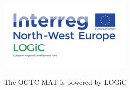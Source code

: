\documentclass{article}
\begin{document}
\begin{multicols*}{2}
\begin{itemize}
\end{itemize}

\vfill

\begin{center}

\includegraphics[width=\linewidth]{logiclogo.png}

\end{center}

\centering \small{The OGTC MAT is powered by LOGiC}

\end{multicols*}
\end{document}
